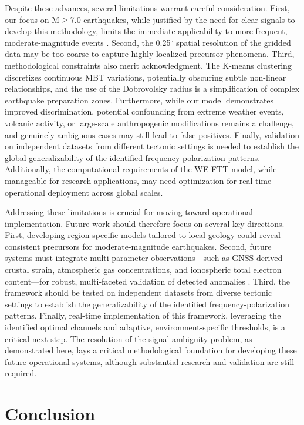\documentclass[preprint,review,12pt,authoryear]{elsarticle}
\begin{document}
Despite these advances, several limitations warrant careful consideration. First, our focus on M$\ge$7.0 earthquakes, while justified by the need for clear signals to develop this methodology, limits the immediate applicability to more frequent, moderate-magnitude events \citep{jingLandAtmosphereMeteorological2019}. Second, the 0.25$^{\circ}$ spatial resolution of the gridded data may be too coarse to capture highly localized precursor phenomena. Third, methodological constraints also merit acknowledgment. The K-means clustering discretizes continuous MBT variations, potentially obscuring subtle non-linear relationships, and the use of the Dobrovolsky radius is a simplification of complex earthquake preparation zones. Furthermore, while our model demonstrates improved discrimination, potential confounding from extreme weather events, volcanic activity, or large-scale anthropogenic modifications remains a challenge, and genuinely ambiguous cases may still lead to false positives. Finally, validation on independent datasets from different tectonic settings is needed to establish the global generalizability of the identified frequency-polarization patterns. Additionally, the computational requirements of the WE-FTT model, while manageable for research applications, may need optimization for real-time operational deployment across global scales.


Addressing these limitations is crucial for moving toward operational implementation. Future work should therefore focus on several key directions. First, developing region-specific models tailored to local geology could reveal consistent precursors for moderate-magnitude earthquakes. Second, future systems must integrate multi-parameter observations---such as GNSS-derived crustal strain, atmospheric gas concentrations, and ionospheric total electron content---for robust, multi-faceted validation of detected anomalies \citep{hayakawaIntegratedAnalysisMultiParameter2024}. Third, the framework should be tested on independent datasets from diverse tectonic settings to establish the generalizability of the identified frequency-polarization patterns. Finally, real-time implementation of this framework, leveraging the identified optimal channels and adaptive, environment-specific thresholds, is a critical next step. The resolution of the signal ambiguity problem, as demonstrated here, lays a critical methodological foundation for developing these future operational systems, although substantial research and validation are still required.


\section{Conclusion}
\end{document}
